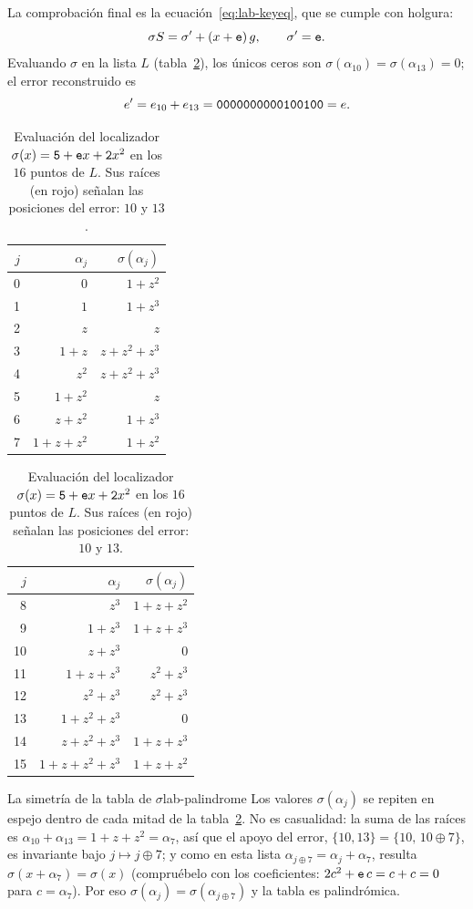 \documentclass[11pt,a4paper,oneside]{report}
\newcommand{\hx}[1]{\text{\texttt{#1}}}
\begin{document}
La comprobación final es la ecuación~\eqref{eq:lab-keyeq}, que se cumple
con holgura:
\[
\sigma S=\sigma'+(x+\hx e)\,g,\qquad \sigma'=\hx e .
\]
Evaluando $\sigma$ en la lista $L$ (tabla~\ref{tab:lab-sigma}), los
únicos ceros son $\sigma(\alpha_{10})=\sigma(\alpha_{13})=0$; el error
reconstruido es
\[
e'=e_{10}+e_{13}=\hx{0000000000100100}=e .
\]

\begin{table}[htbp]
\centering
\footnotesize
\begin{minipage}[t]{0.48\textwidth}\centering
\begin{tabular}{rrr}
\toprule
$j$ & $\alpha_j$ & $\sigma(\alpha_j)$\\
\midrule
0 & $0$ & $1+z^2$\\
1 & $1$ & $1+z^3$\\
2 & $z$ & $z$\\
3 & $1+z$ & $z+z^2+z^3$\\
4 & $z^2$ & $z+z^2+z^3$\\
5 & $1+z^2$ & $z$\\
6 & $z+z^2$ & $1+z^3$\\
7 & $1+z+z^2$ & $1+z^2$\\
\bottomrule
\end{tabular}
\end{minipage}\hfill
\begin{minipage}[t]{0.48\textwidth}\centering
\begin{tabular}{rrr}
\toprule
$j$ & $\alpha_j$ & $\sigma(\alpha_j)$\\
\midrule
8 & $z^3$ & $1+z+z^2$\\
9 & $1+z^3$ & $1+z+z^3$\\
10 & $z+z^3$ & \textcolor{mcred}{\textbf{$0$}}\\
11 & $1+z+z^3$ & $z^2+z^3$\\
12 & $z^2+z^3$ & $z^2+z^3$\\
13 & $1+z^2+z^3$ & \textcolor{mcred}{\textbf{$0$}}\\
14 & $z+z^2+z^3$ & $1+z+z^3$\\
15 & $1+z+z^2+z^3$ & $1+z+z^2$\\
\bottomrule
\end{tabular}
\end{minipage}
\caption{Evaluación del localizador $\sigma(x)=\hx5+\hx e x+\hx2x^2$ en
los $16$ puntos de $L$. Sus raíces (en rojo) señalan las posiciones del
error: $10$ y $13$.}
\label{tab:lab-sigma}
\end{table}

\begin{observacion}{La simetría de la tabla de $\sigma$}{lab-palindrome}
Los valores $\sigma(\alpha_j)$ se repiten en espejo dentro de cada mitad
de la tabla~\ref{tab:lab-sigma}. No es casualidad: la suma de las raíces
es $\alpha_{10}+\alpha_{13}=1+z+z^2=\alpha_7$, así que el apoyo del
error, $\{10,13\}=\{10,\,10\oplus7\}$, es invariante bajo
$j\mapsto j\oplus7$; y como en esta lista
$\alpha_{j\oplus7}=\alpha_j+\alpha_7$, resulta
$\sigma(x+\alpha_7)=\sigma(x)$ (compruébelo con los coeficientes:
$2c^2+\hx e\,c=c+c=0$ para $c=\alpha_7$). Por eso
$\sigma(\alpha_j)=\sigma(\alpha_{j\oplus7})$ y la tabla es palindrómica.
\end{observacion}
\end{document}
